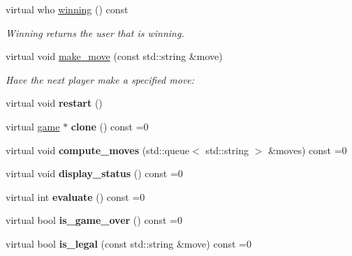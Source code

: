 \begin{DoxyCompactItemize}
\item 
virtual who \hyperlink{classmain__savitch__14_1_1game_a081611c42aa66b4d91bbefeec47c7c4e}{winning} () const 
\begin{DoxyCompactList}\small\item\em Winning returns the user that is winning. \end{DoxyCompactList}\item 
virtual void \hyperlink{classmain__savitch__14_1_1game_a20597d0caa907aea47b27fed8be3759b}{make\+\_\+move} (const std\+::string \&move)\hypertarget{classmain__savitch__14_1_1game_a20597d0caa907aea47b27fed8be3759b}{}\label{classmain__savitch__14_1_1game_a20597d0caa907aea47b27fed8be3759b}

\begin{DoxyCompactList}\small\item\em Have the next player make a specified move\+: \end{DoxyCompactList}\item 
virtual void {\bfseries restart} ()\hypertarget{classmain__savitch__14_1_1game_ad521a7d78e7c163a0bc28b709f0d45fd}{}\label{classmain__savitch__14_1_1game_ad521a7d78e7c163a0bc28b709f0d45fd}

\item 
virtual \hyperlink{classmain__savitch__14_1_1game}{game} $\ast$ {\bfseries clone} () const =0\hypertarget{classmain__savitch__14_1_1game_a7b663057f59210dd52738facfc40d959}{}\label{classmain__savitch__14_1_1game_a7b663057f59210dd52738facfc40d959}

\item 
virtual void {\bfseries compute\+\_\+moves} (std\+::queue$<$ std\+::string $>$ \&moves) const =0\hypertarget{classmain__savitch__14_1_1game_a2c0c049f5861026d0f639b5837889b7a}{}\label{classmain__savitch__14_1_1game_a2c0c049f5861026d0f639b5837889b7a}

\item 
virtual void {\bfseries display\+\_\+status} () const =0\hypertarget{classmain__savitch__14_1_1game_ac8205178922c49bab2865187e834b726}{}\label{classmain__savitch__14_1_1game_ac8205178922c49bab2865187e834b726}

\item 
virtual int {\bfseries evaluate} () const =0\hypertarget{classmain__savitch__14_1_1game_a9b9c8c5e9aa57c9a430f20b87cb047aa}{}\label{classmain__savitch__14_1_1game_a9b9c8c5e9aa57c9a430f20b87cb047aa}

\item 
virtual bool {\bfseries is\+\_\+game\+\_\+over} () const =0\hypertarget{classmain__savitch__14_1_1game_a49eed20648918b03fd3e2cf78987b3d1}{}\label{classmain__savitch__14_1_1game_a49eed20648918b03fd3e2cf78987b3d1}

\item 
virtual bool {\bfseries is\+\_\+legal} (const std\+::string \&move) const =0\hypertarget{classmain__savitch__14_1_1game_ad38351422ca1ee3ae58440c1c6b36b30}{}\label{classmain__savitch__14_1_1game_ad38351422ca1ee3ae58440c1c6b36b30}

\end{DoxyCompactItemize}

